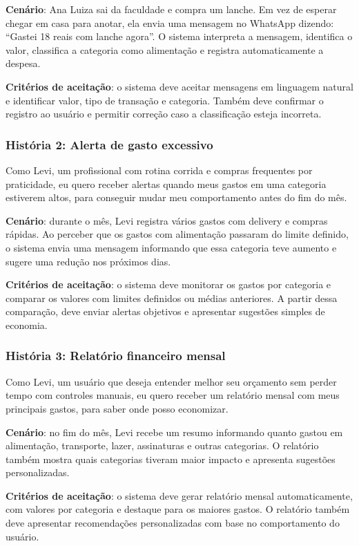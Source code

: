 \textbf{Cenário}: Ana Luiza sai da faculdade e compra um lanche. Em vez de esperar chegar em casa para anotar, ela envia uma mensagem no WhatsApp dizendo: “Gastei 18 reais com lanche agora”. O sistema interpreta a mensagem, identifica o valor, classifica a categoria como alimentação e registra automaticamente a despesa.

\textbf{Critérios de aceitação}: o sistema deve aceitar mensagens em linguagem natural e identificar valor, tipo de transação e categoria. Também deve confirmar o registro ao usuário e permitir correção caso a classificação esteja incorreta.

\subsubsection{História 2: Alerta de gasto excessivo}

Como Levi, um profissional com rotina corrida e compras frequentes por praticidade, eu quero receber alertas quando meus gastos em uma categoria estiverem altos, para conseguir mudar meu comportamento antes do fim do mês.

\textbf{Cenário}: durante o mês, Levi registra vários gastos com delivery e compras rápidas. Ao perceber que os gastos com alimentação passaram do limite definido, o sistema envia uma mensagem informando que essa categoria teve aumento e sugere uma redução nos próximos dias.

\textbf{Critérios de aceitação}: o sistema deve monitorar os gastos por categoria e comparar os valores com limites definidos ou médias anteriores. A partir dessa comparação, deve enviar alertas objetivos e apresentar sugestões simples de economia.

\subsubsection{História 3: Relatório financeiro mensal}

Como Levi, um usuário que deseja entender melhor seu orçamento sem perder tempo com controles manuais, eu quero receber um relatório mensal com meus principais gastos, para saber onde posso economizar.

\textbf{Cenário}: no fim do mês, Levi recebe um resumo informando quanto gastou em alimentação, transporte, lazer, assinaturas e outras categorias. O relatório também mostra quais categorias tiveram maior impacto e apresenta sugestões personalizadas.

\textbf{Critérios de aceitação}: o sistema deve gerar relatório mensal automaticamente, com valores por categoria e destaque para os maiores gastos. O relatório também deve apresentar recomendações personalizadas com base no comportamento do usuário.

